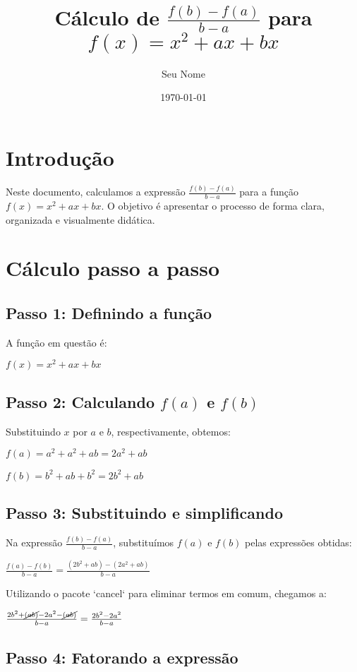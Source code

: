 \documentclass{article}
\title{Cálculo de $\frac{f(b) - f(a)}{b - a}$ para $f(x) = x^2 + ax + bx$}
\author{Seu Nome}
\date{\today}
\begin{document}
\maketitle

\section{Introdução}

Neste documento, calculamos a expressão $\frac{f(b) - f(a)}{b - a}$ para a função $f(x) = x^2 + ax + bx$. O objetivo é apresentar o processo de forma clara, organizada e visualmente didática.

\section{Cálculo passo a passo}

\subsection{Passo 1: Definindo a função}

A função em questão é:

$f(x) = x^2 + ax + bx$

\subsection{Passo 2: Calculando $f(a)$ e $f(b)$}

Substituindo $x$ por $a$ e $b$, respectivamente, obtemos:

$f(a) = a^2 + a^2 + ab = 2a^2 + ab$

$f(b) = b^2 + ab + b^2 = 2b^2 + ab$

\subsection{Passo 3: Substituindo e simplificando}

Na expressão $\frac{f(b) - f(a)}{b - a}$, substituímos $f(a)$ e $f(b)$ pelas expressões obtidas:

$\frac{f(a) - f(b)}{b - a} = \frac{(2b^2 + ab) - (2a^2 + ab)}{b - a}$

Utilizando o pacote `cancel` para eliminar termos em comum, chegamos a:

$\frac{2b^2 + \cancel{(ab)} - 2a^2 - \cancel{(ab)}}{b - a} = \frac{2b^2 - 2a^2}{b - a}$

\subsection{Passo 4: Fatorando a expressão}
\end{document}
